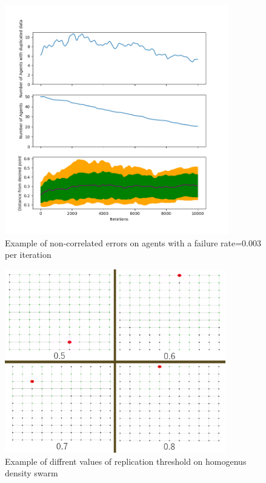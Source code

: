 \documentclass{UoYCSproject}
\begin{document}
\begin{figure}[htb]
\label{fig:Data5}
\begin{center}
\centering
\includegraphics[width=\linewidth, height=10cm]{"./PrelimData/Non_correlated_errors_test1.png"}
\caption{Example of non-correlated errors on agents with a failure rate=0.003 per iteration}
\end{center}
\end{figure}

\begin{figure}[htb]
\label{fig:Data6}
\begin{center}
\centering
\includegraphics[width=\linewidth, height=8cm]{"./MiscImgs/Replication_No_Suicide_threshold_Together.png"}
\caption{Example of diffrent values of replication threshold on homogenus density swarm}
\end{center}
\end{figure}
\end{document}
